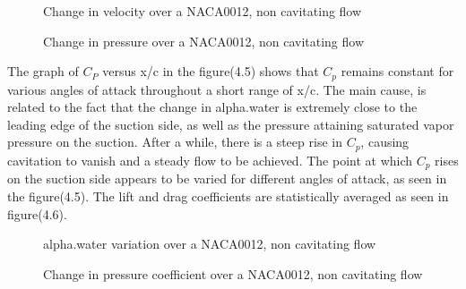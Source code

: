 \begin{figure}[H]
    \centering
    \qquad
   \qquad
      \caption{Change in velocity over a NACA0012, non cavitating flow}
    \label{fig:fig16}
\end{figure}
 \begin{figure}[H]
    \centering
    \qquad
   \qquad
      \caption{Change in pressure over a NACA0012, non cavitating flow}
    \label{fig:fig16}
\end{figure}
The graph of $C_P$ versus x/c in the figure(4.5) shows that $C_p$ remains constant for various angles of attack throughout a short range of x/c.
The main cause, is related to the fact that the change in alpha.water is extremely close to the leading edge of 
the suction side, as well as the pressure attaining saturated vapor pressure on the suction.
After a while, there is a steep rise in $C_p$, causing cavitation to vanish and a steady flow to be achieved.
The point at which $C_p$ rises on the suction side appears to be varied for different angles of attack, as seen in the figure(4.5). 
The lift and drag coefficients are statistically averaged as seen in figure(4.6).
  \begin{figure}[H]
    \centering
    \qquad
   \qquad
      \caption{alpha.water variation over a NACA0012, non cavitating flow}
    \label{fig:fig16}
\end{figure}
 \begin{figure}[H]
    \centering
    \qquad
   \qquad
      \caption{Change in pressure coefficient over a NACA0012, non cavitating flow}
    \label{fig:fig16}
\end{figure} 
  
